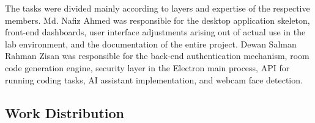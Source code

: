 \documentclass[12pt, a4paper]{report}
\begin{document}
\begin{justify}
{    The tasks were divided mainly according to layers and expertise of the respective members. Md. Nafiz Ahmed was responsible for the desktop application skeleton, front-end dashboards, user interface adjustments arising out of actual use in the lab environment, and the documentation of the entire project. Dewan Salman Rahman Zisan was responsible for the back-end authentication mechanism, room code generation engine, security layer in the Electron main process, API for running coding tasks, AI assistant implementation, and webcam face detection.
  }
\end{justify}

\subsection{Work Distribution}
\end{document}
